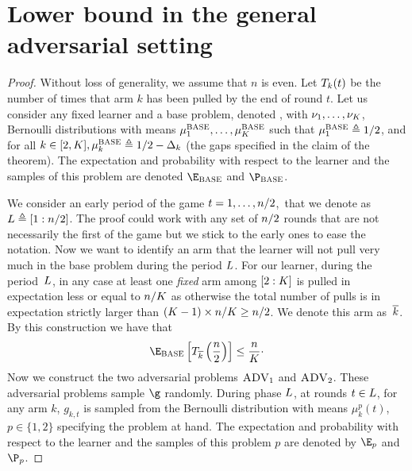 \section{Lower bound in the general adversarial setting} %
\label{app:prooflowadPRO}
%
	\setcounter{scratchcounter}{\value{theorem}}
\toto*
\setcounter{theorem}{\the\numexpr\value{scratchcounter}}
\begin{proof}%
	Without loss of generality, we assume that $n$ is even.
	Let $T_{k}(t)$ be the number of times that arm 
	 $k$ has been pulled by the end of round $t$.
	Let us consider any fixed learner and a base problem, denoted \basePro{}, with $\nu_1,\ldots, \nu_K$, 
	Bernoulli distributions with means $\mu^{\textsc{BASE}}_1,\ldots, \mu^{\textsc{BASE}}_K$ 
	such that $\mu^{\textsc{BASE}}_1\triangleq 1/2$, and for all $k\in[2,K], \mu^{\textsc{BASE}}_k\triangleq1/2-\Delta_k$ 
	(the gaps specified in the claim of the theorem).
		The expectation and probability with respect to the
	learner and the samples of this problem are denoted
	$\Exp_{\basePro}$ and $\Pro_{\basePro}$.%
	
	We consider  an early  period of the game $t=1, \dots, n/2$,\
	that we denote as $L\triangleq[1: n/2]$. %
	The proof could work with any set of $n/2$ 
	rounds that are not necessarily the first of the game 
	but we stick to the early ones to ease the notation.
	Now we want to identify an arm that the learner will 
	not pull
	very much in the base problem \basePro{}
	during the period $L$.
	For our learner, during the period~$L$, in 
	any case at least one \emph{fixed} arm  among $[2:K]$ is pulled 
	in expectation %
	less or equal to   
	$ n/K $ as otherwise the total 
	number of pulls
	is in expectation strictly larger than $(K-1)\times n/K \geq n/2$. 
	We denote this arm as~$\overline k$. By this construction we have that
	\begin{equation}\label{eq:notSoMuchPullsAD}
	\Exp_{\basePro}\left[\pullsNumber_{\refarm}\left(\frac{n}{2}\right) \right]
	\leq  \frac{\timeHorizon}{\nArms}\cdot
	\end{equation}
	Now we construct the two adversarial problems $\textsc{ADV}_1$ and  $\textsc{ADV}_2$.
	These adversarial problems sample  $\gainVector$ randomly.
	 During phase $L$, at rounds $t\in L$, 
	 for any arm $k$, $g_{k,t}$ is sampled from the Bernoulli 
	 distribution with means $\mu_{k}^{p}(t)$, $p\in\{1,2\}$ 
	 specifying the problem at hand.
	The expectation and probability with respect to the
	learner and the samples of this problem $p$ are denoted by
	$\Exp_{p}$ and~$\Pro_{p}$.
	

\end{proof}
